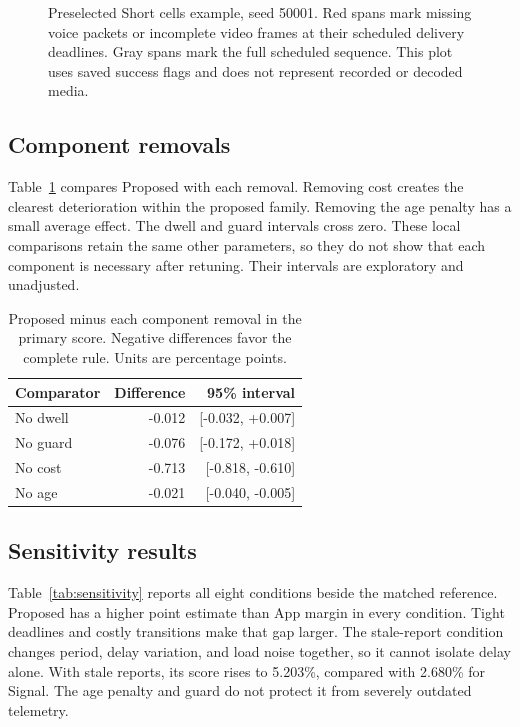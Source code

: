 \documentclass[11pt,a4paper]{article}
\begin{document}
\begin{figure}[htbp]
\caption{Preselected Short cells example, seed 50001. Red spans mark missing voice packets or incomplete video frames at their scheduled delivery deadlines. Gray spans mark the full scheduled sequence. This plot uses saved success flags and does not represent recorded or decoded media.}\label{fig:timeline}
\end{figure}

\subsection{Component removals}
Table~\ref{tab:ablation} compares Proposed with each removal. Removing cost creates the clearest deterioration within the proposed family. Removing the age penalty has a small average effect. The dwell and guard intervals cross zero. These local comparisons retain the same other parameters, so they do not show that each component is necessary after retuning. Their intervals are exploratory and unadjusted.

\begin{table}[htbp]\centering\small
\caption{Proposed minus each component removal in the primary score. Negative differences favor the complete rule. Units are percentage points.}\label{tab:ablation}
\begin{tabular}{@{}lrr@{}}\toprule Comparator & Difference & 95\% interval\\\midrule
No dwell & -0.012 & [-0.032, +0.007] \\
No guard & -0.076 & [-0.172, +0.018] \\
No cost & -0.713 & [-0.818, -0.610] \\
No age & -0.021 & [-0.040, -0.005] \\
\bottomrule\end{tabular}\end{table}

\subsection{Sensitivity results}
Table~\ref{tab:sensitivity} reports all eight conditions beside the matched reference. Proposed has a higher point estimate than App margin in every condition. Tight deadlines and costly transitions make that gap larger. The stale-report condition changes period, delay variation, and load noise together, so it cannot isolate delay alone. With stale reports, its score rises to 5.203\%, compared with 2.680\% for Signal. The age penalty and guard do not protect it from severely outdated telemetry.
\end{document}
